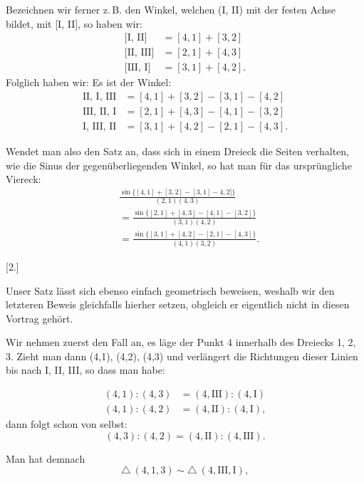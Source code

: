 
Bezeichnen wir ferner z.\,B. den Winkel, welchen (I, II) mit der festen Achse bildet, mit [I, II],
so haben wir:
\[
\begin{array}{rl}
\text{[I, II]} & = [4,1] + [3,2] \\
\text{[II, III]} & = [2,1] + [4,3] \\
\text{[III, I]} & = [3,1] + [4,2].
\end{array}
\]
Folglich haben wir: Es ist der Winkel:
\[
\begin{array}{rl}
\text{II, I, III} & = [4,1] + [3,2] - [3,1] - [4,2] \\
\text{III, II, I} & = [2,1] + [4,3] - [4,1] - [3,2] \\
\text{I, III, II} & = [3,1] + [4,2] - [2,1] - [4,3].
\end{array}
\]

Wendet man also den Satz an, dass sich in einem Dreieck die Seiten verhalten, wie die Sinus der
gegenüberliegenden Winkel, so hat man für das ursprüngliche Viereck:
\[
\begin{aligned}
&\frac{\sin\{[4,1]+[3,2]-[3,1]-4,2]\}}{(2,1)(4,3)}\\
&=\frac{\sin\{[2,1]+[4,3]-[4,1]-[3,2]\}}{(3,1)(4,2)}\\
&=\frac{\sin\{[3,1]+[4,2]-[2,1]-[4,3]\}}{(4,1)(3,2)}.
\end{aligned}
\]

\begin{center}
[2.]
\end{center}

Unser Satz lässt sich ebenso einfach geometrisch beweisen, weshalb wir den letzteren Beweis
gleichfalls hierher setzen, obgleich er eigentlich nicht in diesen Vortrag gehört.

Wir nehmen zuerst den Fall an, es läge der Punkt 4 innerhalb des Dreiecks 1, 2, 3. Zieht man dann
(4,1), (4,2), (4,3) und verlängert die Richtungen dieser Linien bis nach I, II, III, so dass man
habe:

\begin{center}\end{center}

\[
\begin{array}{rl}
(4,1) : (4,3) & = (4,\text{III}) : (4,\text{I}) \\
(4,1) : (4,2) & = (4,\text{II}) : (4,\text{I}),
\end{array}
\]
dann folgt schon von selbst:
\[
(4,3) : (4,2) = (4,\text{II}) : (4,\text{III}).
\]

Man hat demnach
\[
\triangle\ (4,1,3) \sim \triangle\ (4,\text{III},\text{I}),
\]
